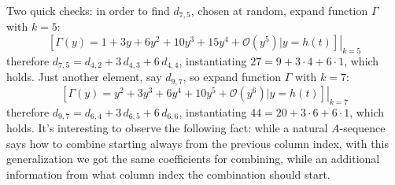 \documentclass[11pt,a4paper]{article} %
\begin{document}
    Two quick checks: in order to find $d_{7,5}$, chosen at random, 
    expand function $\Gamma$ with $k=5$:
    \begin{displaymath}
        \left.\left[\Gamma(y)=1 + 3y + 6y^2 + 10y^3 + 15y^4 + \mathcal{O}(y^5) 
            \big| y = h(t) \right]\right|_{k=5}
    \end{displaymath}
    therefore $d_{7,5}=d_{4,2} + 3\,d_{4,3} + 6\,d_{4,4}$, 
    instantiating $27 = 9 + 3\cdot4 + 6\cdot1$, which holds.
    Just another element, say $d_{9,7}$, so expand function $\Gamma$ with $k=7$:
    \begin{displaymath}
        \left.\left[\Gamma(y)=y^2 + 3y^3 + 6y^4 + 10y^5 +  \mathcal{O}(y^6) 
            \big| y = h(t) \right]\right|_{k=7}
    \end{displaymath}
    therefore $d_{9,7}=d_{6,4} + 3\,d_{6,5} + 6\,d_{6,6}$, 
    instantiating $44 = 20 + 3\cdot6 + 6\cdot1$, which holds.
    It's interesting to observe the following fact: while a natural $A$-sequence
    says how to combine starting always from the previous column index, with
    this generalization we got the same coefficients for combining, while
    an additional information from what column index the combination should start.
\end{document}
